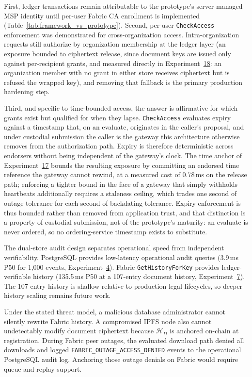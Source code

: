 \documentclass[preprint,12pt]{elsarticle}
\begin{document}
First, ledger transactions remain
attributable to the prototype's server-managed MSP identity until per-user
Fabric CA enrollment is implemented (Table~\ref{tab:framework_vs_prototype}).
Second, per-user \texttt{CheckAccess} enforcement was demonstrated for
cross-organization access. Intra-organization requests still authorize
by organization membership at the ledger layer (an exposure bounded
to ciphertext release, since document keys are issued only against
per-recipient grants, and measured directly in
Experiment~\hyperref[sec:exp_db_mutation]{18}: an organization member
with no grant in either store receives ciphertext but is refused the
wrapped key), and removing that fallback is the primary
production hardening step.

Third, and specific to time-bounded access, the answer is affirmative for
which grants exist but qualified for when they lapse. \texttt{CheckAccess}
evaluates expiry against a timestamp that, on an evaluate, originates in the
caller's proposal, and under custodial submission the caller is the gateway
this architecture otherwise removes from the authorization path. Expiry is
therefore deterministic across endorsers without being independent of the
gateway's clock. The time anchor of
Experiment~\hyperref[sec:exp_timeanchor]{17} bounds the resulting exposure
by committing an endorsed time reference the gateway cannot rewind, at a
measured cost of 0.78\,ms on the release path; enforcing a tighter bound in
the face of a gateway that simply withholds heartbeats additionally requires
a staleness ceiling, which trades one second of outage tolerance for each
second of backdating tolerance. Expiry enforcement is thus bounded rather
than removed from application trust, and that distinction is a property of
custodial submission, not of the prototype's maturity: an evaluate is never
ordered, so no ordering-service timestamp exists to substitute.

The dual-store audit design separates operational speed from independent
verifiability. PostgreSQL provides low-latency operational audit queries
(3.9\,ms P50 for 1,000 events, Experiment~\hyperref[sec:exp_audit]{4}). Fabric
\texttt{GetHistoryForKey} provides ledger-verifiable history (135.5\,ms P50
at a 107-entry document history, Experiment~\hyperref[sec:exp_gethistory]{7}).
The 107-entry history is shallow relative to production legal lifecycles, so
deeper-history scaling remains future work.

Under the stated threat model, a malicious database administrator cannot
silently rewrite Fabric history. A compromised IPFS node also cannot
undetectably modify document ciphertext because $\mathcal{H}_D$ is anchored
on-chain at registration. During Fabric peer outages, the evaluated download
path denied all downloads and logged \texttt{FABRIC\_OUTAGE\_ACCESS\_DENIED}
events to the operational \mbox{PostgreSQL} audit log. Anchoring those outage
denials on Fabric would require queue-and-replay support.
\end{document}
